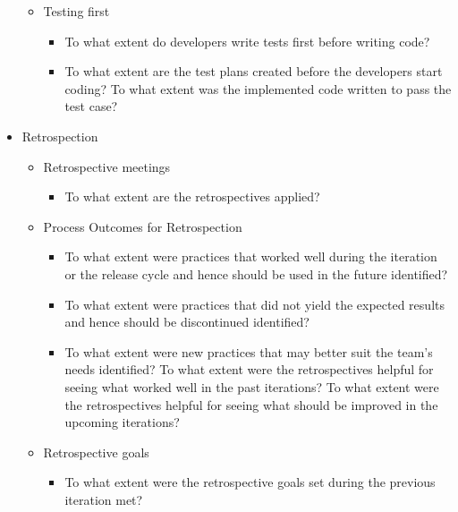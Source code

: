 \begin{itemize}
\begin{itemize}
\begin{itemize}
				\end{itemize}
		\end{itemize}
		\begin{itemize}
			\item Testing first
				\begin{itemize}
					\item To what extent do developers write tests first before writing code?
					\item To what extent are the test plans created before the developers start coding?
					\addition To what extent was the implemented code written to pass the test case?
				\end{itemize}
		\end{itemize}
	\item Retrospection
		\begin{itemize}
			\item Retrospective meetings
				\begin{itemize}
					\item To what extent are the retrospectives applied?				
				\end{itemize}
			\item Process Outcomes for Retrospection
				\begin{itemize}
					\item To what extent were practices that worked well during the iteration or the release cycle and hence should be used in the future identified?
					\item To what extent were practices that did not yield the expected results and hence should be discontinued identified?
					\item To what extent were new practices that may better suit the team's needs identified?
					\addition To what extent were the retrospectives helpful for seeing what worked well in the past iterations?
					\addition To what extent were the retrospectives helpful for seeing what should be improved in the upcoming iterations?
				\end{itemize}
		\end{itemize}
		\begin{itemize}
			\item Retrospective goals
				\begin{itemize}
					\item To what extent were the retrospective goals set during the previous iteration met?
				\end{itemize}
		\end{itemize}

\end{itemize}
